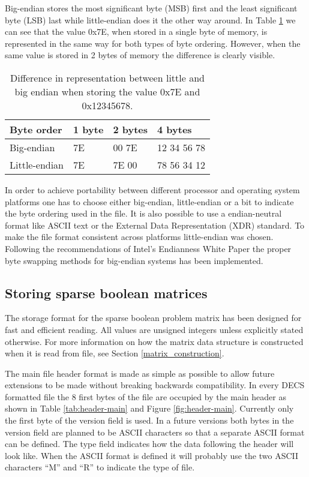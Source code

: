 Big-endian stores the most significant byte (MSB) first and the least significant byte (LSB) last while little-endian does it the other way around.
In Table \ref{tab:endian} we can see that the value 0x7E, when stored in a single byte of memory, is represented in the same way for both types of byte ordering.
However, when the same value is stored in 2 bytes of memory the difference is clearly visible.

\begin{table}[htbp]
	\centering
	\begin{tabular}{|l||l|l||l|}
		\hline
		\bf Byte order & \bf 1 byte & \bf 2 bytes & \bf 4 bytes \\ \hline
		Big-endian    & 7E & 00 7E & 12 34 56 78 \\ \hline
		Little-endian & 7E & 7E 00 & 78 56 34 12 \\ \hline
	\end{tabular}
	\caption{Difference in representation between little and big endian when storing the value 0x7E and 0x12345678.}
	\label{tab:endian}
\end{table}

In order to achieve portability between different processor and operating system platforms one has to choose either big-endian, little-endian or a bit to indicate the byte ordering used in the file.
It is also possible to use a endian-neutral format like ASCII text or the External Data Representation (XDR) \cite{RFC4506} standard.
To make the file format consistent across platforms little-endian was chosen.
Following the recommendations of Intel's Endianness White Paper \cite{intel-endian} the proper byte swapping methods for big-endian systems has been implemented.


\subsection{Storing sparse boolean matrices}

The storage format for the sparse boolean problem matrix has been designed for fast and efficient reading.
All values are unsigned integers unless explicitly stated otherwise.
For more information on how the matrix data structure is constructed when it is read from file, see Section \ref{matrix_construction}.

The main file header format is made as simple as possible to allow future extensions to be made without breaking backwards compatibility.
In every DECS formatted file the 8 first bytes of the file are occupied by the main header as shown in Table \ref{tab:header-main} and Figure \ref{fig:header-main}.
Currently only the first byte of the version field is used.
In a future versions both bytes in the version field are planned to be ASCII characters so that a separate ASCII format can be defined.
The type field indicates how the data following the header will look like.
When the ASCII format is defined it will probably use the two ASCII characters ``M'' and ``R'' to indicate the type of file.

